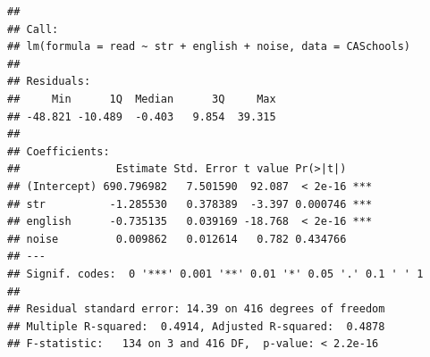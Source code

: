\documentclass[
]{book}
\begin{document}
\begin{verbatim}
## 
## Call:
## lm(formula = read ~ str + english + noise, data = CASchools)
## 
## Residuals:
##     Min      1Q  Median      3Q     Max 
## -48.821 -10.489  -0.403   9.854  39.315 
## 
## Coefficients:
##               Estimate Std. Error t value Pr(>|t|)    
## (Intercept) 690.796982   7.501590  92.087  < 2e-16 ***
## str          -1.285530   0.378389  -3.397 0.000746 ***
## english      -0.735135   0.039169 -18.768  < 2e-16 ***
## noise         0.009862   0.012614   0.782 0.434766    
## ---
## Signif. codes:  0 '***' 0.001 '**' 0.01 '*' 0.05 '.' 0.1 ' ' 1
## 
## Residual standard error: 14.39 on 416 degrees of freedom
## Multiple R-squared:  0.4914, Adjusted R-squared:  0.4878 
## F-statistic:   134 on 3 and 416 DF,  p-value: < 2.2e-16
\end{verbatim}

  
\end{document}
